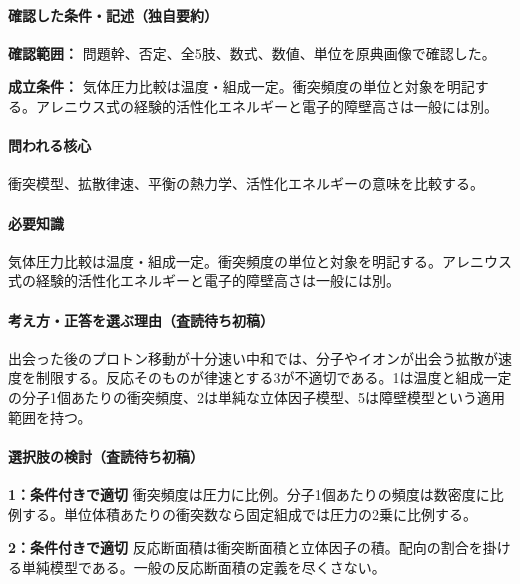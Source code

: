 \paragraph{確認した条件・記述（独自要約）}\mbox{}\par

\noindent\textbf{確認範囲：} 問題幹、否定、全5肢、数式、数値、単位を原典画像で確認した。\par

\noindent\textbf{成立条件：} 気体圧力比較は温度・組成一定。衝突頻度の単位と対象を明記する。アレニウス式の経験的活性化エネルギーと電子的障壁高さは一般には別。\par

\paragraph{問われる核心} 衝突模型、拡散律速、平衡の熱力学、活性化エネルギーの意味を比較する。

\paragraph{必要知識} 気体圧力比較は温度・組成一定。衝突頻度の単位と対象を明記する。アレニウス式の経験的活性化エネルギーと電子的障壁高さは一般には別。

\paragraph{考え方・正答を選ぶ理由（査読待ち初稿）} 出会った後のプロトン移動が十分速い中和では、分子やイオンが出会う拡散が速度を制限する。反応そのものが律速とする3が不適切である。1は温度と組成一定の分子1個あたりの衝突頻度、2は単純な立体因子模型、5は障壁模型という適用範囲を持つ。

\paragraph{選択肢の検討（査読待ち初稿）}\mbox{}\par

\noindent\textbf{1：条件付きで適切} 衝突頻度は圧力に比例。分子1個あたりの頻度は数密度に比例する。単位体積あたりの衝突数なら固定組成では圧力の2乗に比例する。\par

\noindent\textbf{2：条件付きで適切} 反応断面積は衝突断面積と立体因子の積。配向の割合を掛ける単純模型である。一般の反応断面積の定義を尽くさない。\par

